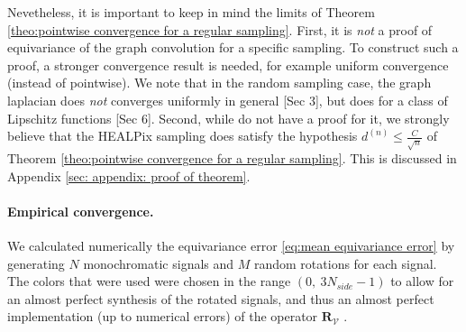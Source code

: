 \documentclass{article} %
\renewcommand{\b}[1]{{\bm{#1}}}  %
\newcommand{\V}{\mathcal{V}}  %
\newcommand{\todo}[1]{{\color[rgb]{.6,.1,.6}{#1}}}
\begin{document}
Nevetheless, it is important to keep in mind the limits of Theorem \ref{theo:pointwise convergence for a regular sampling}.
First, it is \emph{not} a proof of equivariance of the graph convolution for a specific sampling. To construct such a proof, a stronger convergence result is needed, for example uniform convergence (instead of pointwise).
We note that in the random sampling case, the graph laplacian does \emph{not} converges uniformly in general \cite{belkin2007convergence}[Sec 3], but does for a class of Lipschitz functions \cite{belkin2005towards}[Sec 6]. 
\todo{Update once discussed with Martino}
Second, while do not have a proof for it, we strongly believe that the HEALPix sampling does satisfy the hypothesis $d^{(n)}\leq \frac{C}{\sqrt{n}}$ of Theorem \ref{theo:pointwise convergence for a regular sampling}. This is discussed in Appendix \ref{sec: appendix: proof of theorem}.


\paragraph{Empirical convergence.}

We calculated numerically the equivariance error \eqref{eq:mean equivariance error} by generating $N$ monochromatic signals and $M$ random rotations for each signal. 
The colors that were used were chosen in the range $(0,\  3N_{side}-1)$ to allow for an almost perfect synthesis of the rotated signals, and thus an almost perfect implementation (up to numerical errors) of the operator $\b{R}_\V$ \citep{gorski1999healpixprimer}.
\end{document}
